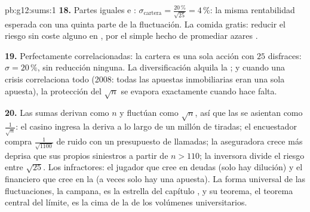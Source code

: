 \begin{solution}{pb:g12:sums:1}
\textbf{18.} Partes iguales e :
$\sigma_{\text{cartera}} = \frac{20\,\%}{\sqrt{25}} = 4\,\%$: la misma
rentabilidad esperada con una quinta parte de la fluctuación. La comida
gratis: reducir el riesgo sin coste alguno en , por el simple
hecho de promediar azares .

\textbf{19.} Perfectamente correlacionadas: la cartera es una sola acción
con $25$ disfraces: $\sigma = 20\,\%$, sin reducción ninguna. La
diversificación alquila la \emph{}; y cuando una crisis
correlaciona todo (2008: todas las apuestas inmobiliarias eran una sola
apuesta), la protección del $\sqrt n$ se evapora exactamente cuando hace
falta.

\textbf{20.} Las sumas derivan como $n$ y fluctúan como $\sqrt n$, así que
las  se asientan como $\frac{1}{\sqrt n}$: el casino ingresa la
deriva a lo largo de un millón de tiradas; el encuestador compra
$\frac{1}{\sqrt{1100}}$ de ruido con un presupuesto de llamadas; la
aseguradora crece más deprisa que sus propios siniestros a partir de
$n > 110$; la inversora divide el riesgo entre $\sqrt{25}$. Los
infractores: el jugador que cree en deudas (solo hay dilución) y el
financiero que cree en la  (a veces solo hay una apuesta). La
forma universal de las fluctuaciones, la campana, es la estrella del
capítulo , y su teorema, el teorema central del límite, es la cima
de la  de los volúmenes universitarios.
\end{solution}
